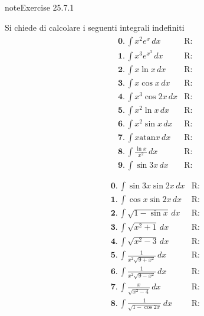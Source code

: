 \documentclass[letterpaper,10pt,italian]{jupyterBook}
\begin{document}
\begin{sphinxadmonition}{note}{Exercise 25.7.1}



\sphinxAtStartPar
Si chiede di calcolare i seguenti integrali indefiniti
\begin{equation*}
\begin{split}\begin{aligned}
 & \mathbf{0.} \,  \int x^2 e^x \, dx & \text{R: } \\
 & \mathbf{1.} \,  \int x^3 e^{x^3} \, dx & \text{R: } \\
 & \mathbf{2.} \,  \int x \ln x \, dx & \text{R: } \\
 & \mathbf{3.} \,  \int x \cos x \, dx & \text{R: } \\
 & \mathbf{4.} \,  \int x^3 \cos 2x \, dx & \text{R: } \\
 & \mathbf{5.} \,  \int x^2 \ln x \, dx & \text{R: } \\
 & \mathbf{6.} \,  \int x^2 \sin x \, dx & \text{R: } \\
 & \mathbf{7.} \,  \int x \text{atan} x \, dx & \text{R: } \\
 & \mathbf{8.} \,  \int \frac{\ln x}{x^2} \, dx & \text{R: } \\
 & \mathbf{9.} \,  \int \sin 3x \, dx & \text{R: } \\
\end{aligned}\end{split}
\end{equation*}\begin{equation*}
\begin{split}\begin{aligned}
 & \mathbf{0.} \,  \int \sin 3x \sin 2x \, dx & \text{R: } \\
 & \mathbf{1.} \,  \int \cos x \sin 2x \, dx & \text{R: } \\
 & \mathbf{2.} \,  \int \sqrt{1 - \sin x} \, dx & \text{R: } \\
 & \mathbf{3.} \,  \int \sqrt{x^2 + 1} \, dx & \text{R: } \\
 & \mathbf{4.} \,  \int \sqrt{x^2 - 3} \, dx & \text{R: } \\
 & \mathbf{5.} \,  \int \frac{1}{x^2 \sqrt{9+x^2}} \, dx & \text{R: } \\
 & \mathbf{6.} \,  \int \frac{1}{x^2 \sqrt{9-x^2}} \, dx & \text{R: } \\
 & \mathbf{7.} \,  \int \frac{x}{\sqrt{x^2-4}} \, dx & \text{R: } \\
 & \mathbf{8.} \,  \int \frac{1}{\sqrt{1 - \cos 2 x}} \, dx & \text{R: } \\

\end{aligned}
\end{split}
\end{equation*}
\end{sphinxadmonition}
\end{document}
